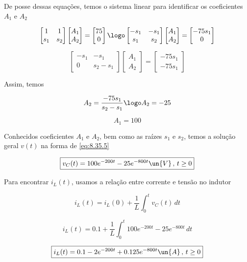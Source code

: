 De posse dessas equações, temos o sistema linear para identificar os coeficientes $A_1$ e $A_2$

\begingroup
\renewcommand*{\arraystretch}{1.5}

\[
    \begin{bmatrix}
        1 & 1    \\
        s_1    & s_2
    \end{bmatrix}
    \begin{bmatrix}
        A_1 \\
        A_2
    \end{bmatrix}
    =
    \begin{bmatrix}
        75 \\
        0
    \end{bmatrix} \logo
    \begin{bmatrix}
        -s_1 & -s_1    \\
        s_1    & s_2
    \end{bmatrix}
    \begin{bmatrix}
        A_1 \\
        A_2
    \end{bmatrix}
    =
    \begin{bmatrix}
        -75s_1 \\
        0
    \end{bmatrix}
\]

\[
    \begin{bmatrix}
        -s_1 & -s_1    \\
        0    & s_2 - s_1
    \end{bmatrix}
    \begin{bmatrix}
        A_1 \\
        A_2
    \end{bmatrix}
    =
    \begin{bmatrix}
        -75s_1 \\
        -75s_1
    \end{bmatrix}
\]

\endgroup

Assim, temos  

\[ A_2 = \frac{-75s_1}{s_2 - s_1} \logo A_2 = -25\] 

\[ A_1 = 100 \] 

Conhecidos coeficientes $A_1$ e $A_2$, bem como as raízes $s_1$ e $s_2$, temos a solução geral $v(t)$ na forma de \eqref{eq:8.35.5}

\[ \boxed{v_C(t) = 100e^{-200t} - 25e^{-800t} \un{V} \, , \, t \geq 0} \]

Para encontrar $i_L(t)$, usamos a relação entre corrente e tensão no indutor   

\[ i_L(t) = i_L(0) + \frac{1}{L} \int_{0}^{t}v_C(t) \, dt \]

\[ i_L(t) = 0.1 + \frac{1}{L} \int_{0}^{t}100e^{-200t} - 25e^{-800t} \, dt \]

\[ \boxed{i_L(t) = 0.1 - 2e^{-200t} + 0.125e^{-800t} \un{A} \, , \, t \geq 0} \]



